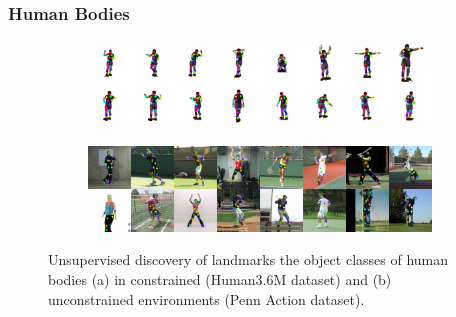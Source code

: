 		\begin{frame}[t]
		\frametitle{Human Bodies}
			\begin{figure}[htp]
				\centering
				\begin{subfigure}{1.\textwidth}
				\includegraphics[trim={0cm 0cm 0cm 0cm},clip, width=1.\linewidth]{fig/shape/0human}\caption{}
				\end{subfigure}
				\begin{subfigure}{1.\textwidth}
				\includegraphics[trim={0cm 0cm 0cm 0cm},clip, width=1.\linewidth]{fig/shape/0penn}\caption{}
				\end{subfigure}
				\caption{{Unsupervised discovery of landmarks the object classes of human bodies (a) in constrained (Human3.6M dataset) and (b) unconstrained environments (Penn Action dataset).}}
				\label{fig:kp_bodies}
			\end{figure}
		\end{frame}

